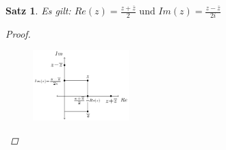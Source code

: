 \documentclass[a4paper,titlepage,oneside]{article}
\def\im{\ensuremath{\mathit{i}} }
\def\sp{\hspace{0,1cm}}
\theoremstyle{thmstyle}
\newtheorem{satz}{Satz}[section]
\theoremstyle{subthmstyle}
\begin{document}
\begin{satz}
Es gilt: $ \displaystyle Re(z) = \frac{z + \overline{z}}{2} \text{ und } Im(z) = \frac{z - \overline{z}}{2\im}$
\begin{proof} \sp
\begin{figure}[ht]\centering
 \includegraphics[width=0.33\textwidth]{images/gaussebene_mit_konj.png}
\end{figure}
\end{proof}
\end{satz}
\end{document}
